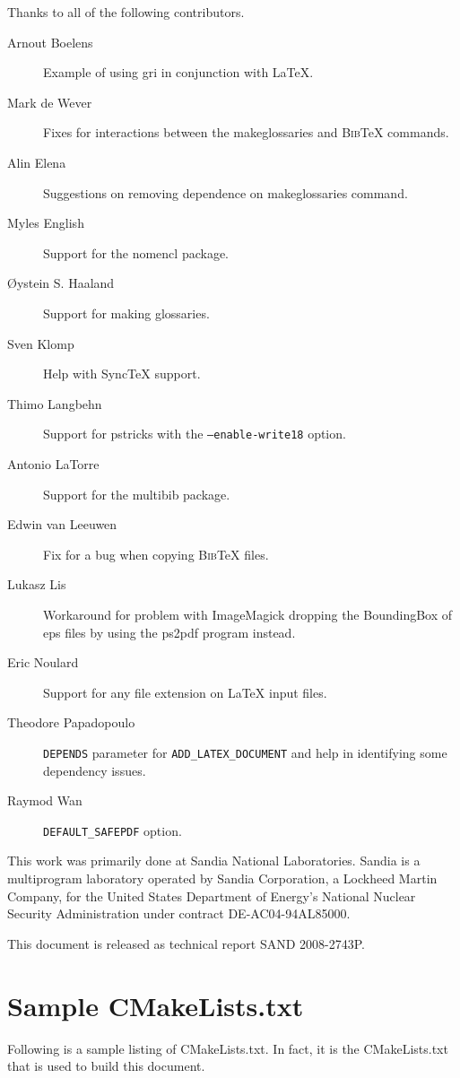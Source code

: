 \documentclass{article}
\newcommand{\SANDNumber}{SAND 2008-2743P}
\newcommand*{\textfile}[1]{\textsf{#1}}
\newcommand*{\textprog}[1]{\textfile{#1}}
\newcommand*{\textlatexpackage}[1]{\textsf{#1}}
\newcommand*{\textcmake}[1]{\texttt{#1}}
\newcommand*{\latex}{\LaTeX\xspace}
\newcommand*{\bibtex}{\textsc{Bib}\TeX\xspace}
\renewcommand*{\synctex}{SyncTeX\xspace}
\newcommand*{\synctex}{SyncTeX\xspace}
\newcommand*{\ald}{\textcmake{ADD\_LATEX\_DOCUMENT}\xspace}
\newcommand*{\includeCodeListing}[2][]{\VerbatimInput[
  frame=single,
  rulecolor=\color{listingframecolor},
  framesep=4pt,#1]{#2}}
\begin{document}
  Thanks to all of the following contributors.

  \begin{description}
  \item[Arnout Boelens] Example of using gri in conjunction with \latex.
  \item[Mark de Wever] Fixes for interactions between the
    \textprog{makeglossaries} and \bibtex commands.
  \item[Alin Elena] Suggestions on removing dependence on makeglossaries
    command.
  \item[Myles English] Support for the \textlatexpackage{nomencl} package. 
  \item[\O{}ystein S. Haaland] Support for making glossaries.
  \item[Sven Klomp] Help with \synctex support.
  \item[Thimo Langbehn] Support for pstricks with the
    \textcmake{--enable-write18} option.
  \item[Antonio LaTorre] Support for the \textlatexpackage{multibib}
    package.
  \item[Edwin van Leeuwen] Fix for a bug when copying \bibtex files.
  \item[Lukasz Lis] Workaround for problem with ImageMagick dropping the
    BoundingBox of eps files by using the \textprog{ps2pdf} program
    instead.
  \item[Eric Noulard] Support for any file extension on \latex input files.
  \item[Theodore Papadopoulo] \textcmake{DEPENDS} parameter for \ald and
    help in identifying some dependency issues.
  \item[Raymod Wan] \textcmake{DEFAULT\_SAFEPDF} option.
  \end{description}

  This work was primarily done at Sandia National Laboratories.  Sandia is
  a multiprogram laboratory operated by Sandia Corporation, a Lockheed
  Martin Company, for the United States Department of Energy's National
  Nuclear Security Administration under contract DE-AC04-94AL85000.

  This document is released as technical report \SANDNumber.


  \appendix

  \section{Sample CMakeLists.txt}
  \label{sec:SampleCMakeLists.txt}

  Following is a sample listing of CMakeLists.txt.  In fact, it is the
  CMakeLists.txt that is used to build this document.

  \includeCodeListing{CMakeLists.txt}


\end{document}
